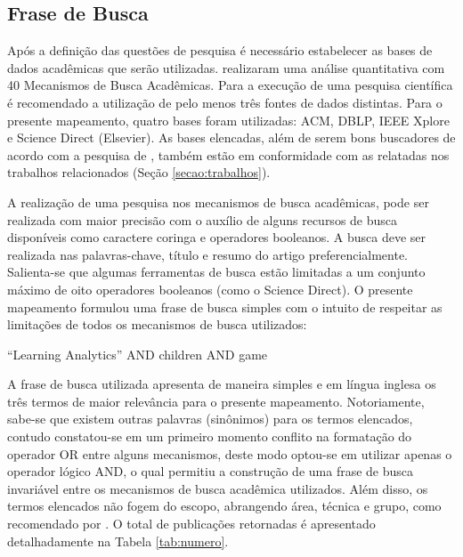 \documentclass[12pt]{article}
\begin{document}
\subsection{Frase de Busca}\label{a:2}

\vspace{-0.1cm}

Após a definição das questões de pesquisa é necessário estabelecer as bases de dados acadêmicas que serão utilizadas.  realizaram uma análise quantitativa com 40 Mecanismos de Busca Acadêmicas. Para a execução de uma pesquisa científica é recomendado a utilização de pelo menos três fontes de dados distintas. Para o presente mapeamento, quatro bases foram utilizadas: ACM, DBLP, IEEE Xplore e Science Direct (Elsevier). As bases elencadas, além de serem bons buscadores de acordo com a pesquisa de , também estão em conformidade com as relatadas nos trabalhos relacionados (Seção \ref{secao:trabalhos}).

A realização de uma pesquisa nos mecanismos de busca acadêmicas, pode ser realizada com maior precisão com o auxílio de alguns recursos de busca disponíveis como caractere coringa e operadores booleanos. A busca deve ser realizada nas palavras-chave, título e resumo do artigo preferencialmente. Salienta-se que algumas ferramentas de busca estão limitadas a um conjunto máximo de oito operadores booleanos (como o Science Direct). O presente mapeamento formulou uma frase de busca simples com o intuito de respeitar as limitações de todos os mecanismos de busca utilizados: 

\begin{framed}
 \centering ``Learning Analytics'' AND children AND game
\end{framed}

\vspace{-0.25cm}

A frase de busca utilizada apresenta de maneira simples e em língua inglesa os três termos de maior relevância para o presente mapeamento. Notoriamente, sabe-se que existem outras palavras (sinônimos) para os termos elencados, contudo constatou-se em um primeiro momento conflito na formatação do operador OR entre alguns mecanismos, deste modo optou-se em utilizar apenas o operador lógico AND, o qual permitiu a construção de uma frase de busca invariável entre os mecanismos de busca acadêmica utilizados. Além disso, os termos elencados não fogem do escopo, abrangendo área, técnica e grupo, como recomendado por . O total de publicações retornadas é apresentado detalhadamente na Tabela \ref{tab:numero}.
\end{document}
